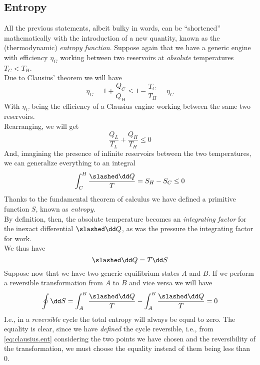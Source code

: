 \documentclass[../qm.tex]{subfiles}
\begin{document}
\subsection{Entropy}
All the previous statements, albeit bulky in words, can be ``shortened'' mathematically with the introduction of a new quantity, known as the (thermodynamic) \emph{entropy function}. Suppose again that we have a generic engine with efficiency $\eta_G$ working between two reservoirs at \textit{absolute} temperatures $T_C<T_H$.\\
Due to Clausius' theorem we will have
\begin{equation*}
	\eta_G=1+\frac{Q_C}{Q_H}\le1-\frac{T_C}{T_H}=\eta_C
\end{equation*}
With $\eta_C$ being the efficiency of a Clausius engine working between the same two reservoirs.\\
Rearranging, we will get
\begin{equation}
	\frac{Q_L}{T_L}+\frac{Q_H}{T_H}\le0
	\label{eq:clausius.ent}
\end{equation}
And, imagining the presence of infinite reservoirs between the two temperatures, we can generalize everything to an integral
\begin{equation}
	\int_{C}^{H}\frac{\slashed\dd Q}{T}=S_H-S_C\le0
	\label{eq:entropyintegral.ent}
\end{equation}
Thanks to the fundamental theorem of calculus we have defined a primitive function $S$, known as \textit{entropy}.\\
By definition, then, the absolute temperature becomes an \emph{integrating factor} for the inexact differential $\slashed\dd Q$, as was the pressure the integrating factor for work.\\
We thus have
\begin{equation}
	\slashed\dd Q=T\dd S
	\label{eq:entropyder.ent}
\end{equation}
Suppose now that we have two generic equilibrium states $A$ and $B$. If we perform a reversible transformation from $A$ to $B$ and vice versa we will have
\begin{equation}
	\oint\dd S=\int_A^B\frac{\slashed\dd Q}{T}-\int_A^B\frac{\slashed\dd Q}{T}=0
	\label{eq:entropyrev.ent}
\end{equation}
I.e., in a \textit{reversible} cycle the total entropy will always be equal to zero. The equality is clear, since we have \textit{defined} the cycle reversible, i.e., from \eqref{eq:clausius.ent} considering the two points we have chosen and the reversibility of the transformation, we must choose the equality instead of them being less than 0.\\
\end{document}
